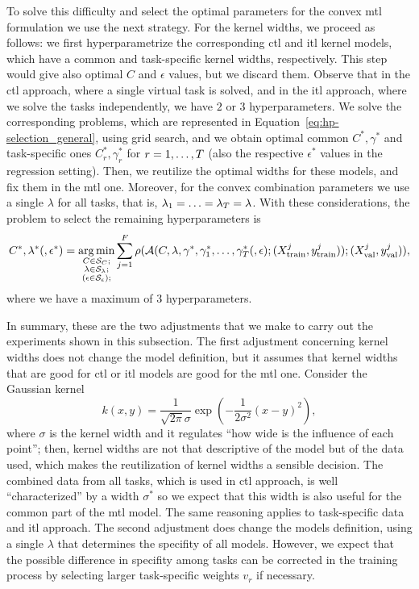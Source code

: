 To solve this difficulty and select the optimal parameters for the convex \acrshort{mtl} formulation we use the next strategy.
%
For the kernel widths, we proceed as follows: we first hyperparametrize the corresponding \acrshort{ctl} and \acrshort{itl} kernel models, which have a common and task-specific kernel widths, respectively. 
This step would give also optimal $C$ and $\epsilon$ values, but we discard them.
Observe that in the \acrshort{ctl} approach, where a single virtual task is solved, and in the \acrshort{itl} approach, where we solve the tasks independently, we have $2$ or $3$ hyperparameters. We solve the corresponding problems, which are represented in Equation~\eqref{eq:hp-selection_general}, using grid search, and we obtain optimal common $C^*, \gamma^*$ and task-specific ones $C_r^*, \gamma^*_r$ for $r=1, \ldots, T$ (also the respective $\epsilon^*$ values in the regression setting).
Then, we reutilize the optimal widths for these models, and fix them in the \acrshort{mtl} one.
%
Moreover, for the convex combination parameters we use a single $\lambda$ for all tasks, that is, $\lambda_1 = \ldots = \lambda_T = \lambda$.
%
With these considerations, the problem to select the remaining hyperparameters is 
\begin{equation}
    \nonumber
    C^*, \lambda^* (, \epsilon^*) = \operatorname*{arg\min}_{\substack{C \in \mathcal{S}_C ; \\ \substack{\lambda \in \mathcal{S}_\lambda} ; \\ \left(\substack{\epsilon \in \mathcal{S}_\epsilon} \right); }}
     \sum_{j=1}^{F} \rho(\mathcal{A}(C, \lambda, \gamma^*, \gamma_1^*, \ldots, \gamma_T^* (, \epsilon); (X^j_\text{train}, y^j_\text{train})); (X^j_\text{val}, y^j_\text{val})) ,
\end{equation}
where we have a maximum of $3$ hyperparameters.

%
In summary, these are the two adjustments that we make to carry out the experiments shown in this subsection.
The first adjustment concerning kernel widths does not change the model definition, but it assumes that kernel widths that are good for \acrshort{ctl} or \acrshort{itl} models are good for the \acrshort{mtl} one. 
Consider the Gaussian kernel
\begin{equation}
    \nonumber
    k(x, y) = \frac{1}{\sqrt{2\pi} \sigma}\exp{\left(-\frac{1}{2\sigma^2} (x-y)^2\right)},
\end{equation}
where $\sigma$ is the kernel width and it regulates ``how wide is the influence of each point'';
then, kernel widths are not that descriptive of the model but of the data used, which makes the reutilization of kernel widths a sensible decision.
The combined data from all tasks, which is used in \acrshort{ctl} approach, is well ``characterized'' by a width $\sigma^*$ so we expect that this width is also useful for the common part of the \acrshort{mtl} model. The same reasoning applies to task-specific data and \acrshort{itl} approach.
%
The second adjustment does change the models definition, using a single $\lambda$ that determines the specifity of all models. However, we expect that the possible difference in specifity among tasks can be corrected in the training process by selecting larger task-specific weights $v_r$ if necessary.

